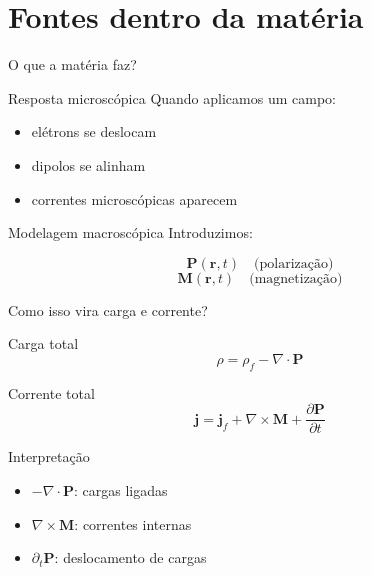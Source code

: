 \documentclass[aspectratio=169]{beamer}
\begin{document}

\section{Fontes dentro da matéria}

\begin{frame}{O que a matéria faz?}

\begin{block}{Resposta microscópica}
Quando aplicamos um campo:
\begin{itemize}
\item elétrons se deslocam
\item dipolos se alinham
\item correntes microscópicas aparecem
\end{itemize}
\end{block}

\pause

\begin{block}{Modelagem macroscópica}
Introduzimos:

\[
\mathbf{P}(\mathbf{r},t) \quad \text{(polarização)}
\]
\[
\mathbf{M}(\mathbf{r},t) \quad \text{(magnetização)}
\]

\end{block}

\end{frame}


\begin{frame}{Como isso vira carga e corrente?}

\begin{block}{Carga total}
\begin{equation}
\rho = \rho_f - \nabla \cdot \mathbf{P}
\end{equation}
\end{block}

\pause

\begin{block}{Corrente total}
\begin{equation}
\mathbf{j} =
\mathbf{j}_f
+
\nabla \times \mathbf{M}
+
\frac{\partial \mathbf{P}}{\partial t}
\end{equation}
\end{block}

\pause

\begin{alertblock}{Interpretação}
\begin{itemize}
\item \(-\nabla\cdot\mathbf{P}\): cargas ligadas
\item \(\nabla\times\mathbf{M}\): correntes internas
\item \(\partial_t \mathbf{P}\): deslocamento de cargas
\end{itemize}
\end{alertblock}

\end{frame}
\end{document}
